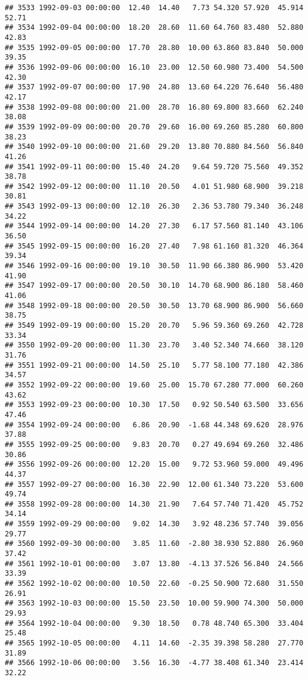 \documentclass{article}\usepackage{graphicx, color}
\makeatletter
\newenvironment{kframe}{%
 \def\at@end@of@kframe{}%
 \ifinner\ifhmode%
  \def\at@end@of@kframe{\end{minipage}}%
  \begin{minipage}{\columnwidth}%
 \fi\fi%
 \def\FrameCommand##1{\hskip\@totalleftmargin \hskip-\fboxsep
 \colorbox{shadecolor}{##1}\hskip-\fboxsep
     \hskip-\linewidth \hskip-\@totalleftmargin \hskip\columnwidth}%
 \MakeFramed {\advance\hsize-\width
   \@totalleftmargin\z@ \linewidth\hsize
   \@setminipage}}%
 {\par\unskip\endMakeFramed%
 \at@end@of@kframe}
\newenvironment{knitrout}{}{} %
\makeatother
\begin{document}
\begin{knitrout}
\begin{kframe}
\begin{verbatim}
## 3533 1992-09-03 00:00:00  12.40  14.40   7.73 54.320 57.920  45.914  52.71
## 3534 1992-09-04 00:00:00  18.20  28.60  11.60 64.760 83.480  52.880  42.83
## 3535 1992-09-05 00:00:00  17.70  28.80  10.00 63.860 83.840  50.000  39.35
## 3536 1992-09-06 00:00:00  16.10  23.00  12.50 60.980 73.400  54.500  42.30
## 3537 1992-09-07 00:00:00  17.90  24.80  13.60 64.220 76.640  56.480  42.17
## 3538 1992-09-08 00:00:00  21.00  28.70  16.80 69.800 83.660  62.240  38.08
## 3539 1992-09-09 00:00:00  20.70  29.60  16.00 69.260 85.280  60.800  38.23
## 3540 1992-09-10 00:00:00  21.60  29.20  13.80 70.880 84.560  56.840  41.26
## 3541 1992-09-11 00:00:00  15.40  24.20   9.64 59.720 75.560  49.352  38.78
## 3542 1992-09-12 00:00:00  11.10  20.50   4.01 51.980 68.900  39.218  30.81
## 3543 1992-09-13 00:00:00  12.10  26.30   2.36 53.780 79.340  36.248  34.22
## 3544 1992-09-14 00:00:00  14.20  27.30   6.17 57.560 81.140  43.106  36.50
## 3545 1992-09-15 00:00:00  16.20  27.40   7.98 61.160 81.320  46.364  39.34
## 3546 1992-09-16 00:00:00  19.10  30.50  11.90 66.380 86.900  53.420  41.90
## 3547 1992-09-17 00:00:00  20.50  30.10  14.70 68.900 86.180  58.460  41.06
## 3548 1992-09-18 00:00:00  20.50  30.50  13.70 68.900 86.900  56.660  38.75
## 3549 1992-09-19 00:00:00  15.20  20.70   5.96 59.360 69.260  42.728  33.34
## 3550 1992-09-20 00:00:00  11.30  23.70   3.40 52.340 74.660  38.120  31.76
## 3551 1992-09-21 00:00:00  14.50  25.10   5.77 58.100 77.180  42.386  34.57
## 3552 1992-09-22 00:00:00  19.60  25.00  15.70 67.280 77.000  60.260  43.62
## 3553 1992-09-23 00:00:00  10.30  17.50   0.92 50.540 63.500  33.656  47.46
## 3554 1992-09-24 00:00:00   6.86  20.90  -1.68 44.348 69.620  28.976  37.88
## 3555 1992-09-25 00:00:00   9.83  20.70   0.27 49.694 69.260  32.486  30.86
## 3556 1992-09-26 00:00:00  12.20  15.00   9.72 53.960 59.000  49.496  44.37
## 3557 1992-09-27 00:00:00  16.30  22.90  12.00 61.340 73.220  53.600  49.74
## 3558 1992-09-28 00:00:00  14.30  21.90   7.64 57.740 71.420  45.752  34.14
## 3559 1992-09-29 00:00:00   9.02  14.30   3.92 48.236 57.740  39.056  29.77
## 3560 1992-09-30 00:00:00   3.85  11.60  -2.80 38.930 52.880  26.960  37.42
## 3561 1992-10-01 00:00:00   3.07  13.80  -4.13 37.526 56.840  24.566  33.39
## 3562 1992-10-02 00:00:00  10.50  22.60  -0.25 50.900 72.680  31.550  26.91
## 3563 1992-10-03 00:00:00  15.50  23.50  10.00 59.900 74.300  50.000  29.93
## 3564 1992-10-04 00:00:00   9.30  18.50   0.78 48.740 65.300  33.404  25.48
## 3565 1992-10-05 00:00:00   4.11  14.60  -2.35 39.398 58.280  27.770  31.89
## 3566 1992-10-06 00:00:00   3.56  16.30  -4.77 38.408 61.340  23.414  32.22

\end{verbatim}
\end{kframe}
\end{knitrout}
\end{document}
